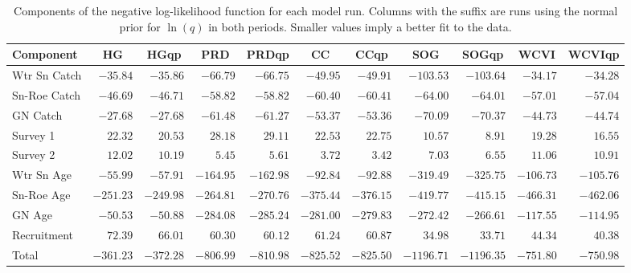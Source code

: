 %
\begin{table}[h]
 \caption{Components of the negative log-likelihood function for each model run. Columns with the suffix are runs using the normal prior for $\ln(q)$ in both periods. Smaller values imply a better fit to the data.}\label{Table:likelihoods}
 \begin{center}
 \begin{scriptsize}
 \begin{tabular}{lrr|rr|rr|rr|rr}\hline\hline
	Component&
\multicolumn{1}{c}{HG}&\multicolumn{1}{c}{HGqp}&\multicolumn{1}{c}{PRD}&\multicolumn{1}{c}{PRDqp}&\multicolumn{1}{c}{CC}&\multicolumn{1}{c}{CCqp}&\multicolumn{1}{c}{SOG}&\multicolumn{1}{c}{SOGqp}&\multicolumn{1}{c}{WCVI}&\multicolumn{1}{c}{WCVIqp}\tabularnewline
\hline
Wtr Sn Catch&$ -35.84$&$ -35.86$&$ -66.79$&$ -66.75$&$ -49.95$&$ -49.91$&$ -103.53$&$ -103.64$&$ -34.17$&$ -34.28$\tabularnewline
Sn-Roe Catch&$ -46.69$&$ -46.71$&$ -58.82$&$ -58.82$&$ -60.40$&$ -60.41$&$  -64.00$&$  -64.01$&$ -57.01$&$ -57.04$\tabularnewline
GN Catch&$ -27.68$&$ -27.68$&$ -61.48$&$ -61.27$&$ -53.37$&$ -53.36$&$  -70.09$&$  -70.37$&$ -44.73$&$ -44.74$\tabularnewline
Survey 1&$  22.32$&$  20.53$&$  28.18$&$  29.11$&$  22.53$&$  22.75$&$   10.57$&$    8.91$&$  19.28$&$  16.55$\tabularnewline
Survey 2&$  12.02$&$  10.19$&$   5.45$&$   5.61$&$   3.72$&$   3.42$&$    7.03$&$    6.55$&$  11.06$&$  10.91$\tabularnewline
Wtr Sn Age&$ -55.99$&$ -57.91$&$-164.95$&$-162.98$&$ -92.84$&$ -92.88$&$ -319.49$&$ -325.75$&$-106.73$&$-105.76$\tabularnewline
Sn-Roe Age&$-251.23$&$-249.98$&$-264.81$&$-270.76$&$-375.44$&$-376.15$&$ -419.77$&$ -415.15$&$-466.31$&$-462.06$\tabularnewline
GN Age&$ -50.53$&$ -50.88$&$-284.08$&$-285.24$&$-281.00$&$-279.83$&$ -272.42$&$ -266.61$&$-117.55$&$-114.95$\tabularnewline
Recruitment&$  72.39$&$  66.01$&$  60.30$&$  60.12$&$  61.24$&$  60.87$&$   34.98$&$   33.71$&$  44.34$&$  40.38$\tabularnewline
\hline
Total&$-361.23$&$-372.28$&$-806.99$&$-810.98$&$-825.52$&$-825.50$&$-1196.71$&$-1196.35$&$-751.80$&$-750.98$\tabularnewline
\hline
\end{tabular}
\end{scriptsize}
\end{center}

\end{table}

